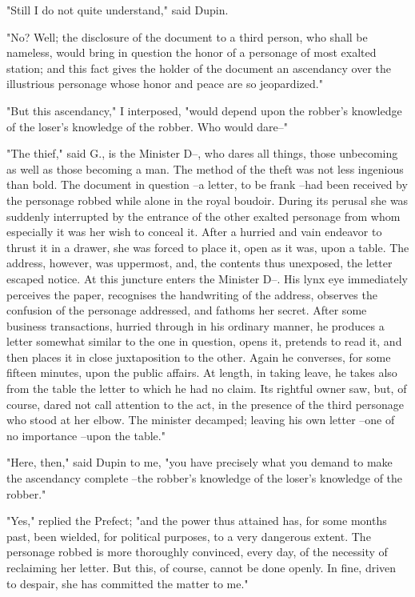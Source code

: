 \documentclass{article}
\begin{document}
"Still I do not quite understand," said Dupin.

"No? Well; the disclosure of the document to a third person, who shall be nameless, would bring in question the honor of a personage of most exalted station; and this fact gives the holder of the document an ascendancy over the illustrious personage whose honor and peace are so jeopardized."

"But this ascendancy," I interposed, "would depend upon the robber's knowledge of the loser's knowledge of the robber. Who would dare--"

"The thief," said G., is the Minister D--, who dares all things, those unbecoming as well as those becoming a man. The method of the theft was not less ingenious than bold. The document in question --a letter, to be frank --had been received by the personage robbed while alone in the royal boudoir. During its perusal she was suddenly interrupted by the entrance of the other exalted personage from whom especially it was her wish to conceal it. After a hurried and vain endeavor to thrust it in a drawer, she was forced to place it, open as it was, upon a table. The address, however, was uppermost, and, the contents thus unexposed, the letter escaped notice. At this juncture enters the Minister D--. His lynx eye immediately perceives the paper, recognises the handwriting of the address, observes the confusion of the personage addressed, and fathoms her secret. After some business transactions, hurried through in his ordinary manner, he produces a letter somewhat similar to the one in question, opens it, pretends to read it, and then places it in close juxtaposition to the other. Again he converses, for some fifteen minutes, upon the public affairs. At length, in taking leave, he takes also from the table the letter to which he had no claim. Its rightful owner saw, but, of course, dared not call attention to the act, in the presence of the third personage who stood at her elbow. The minister decamped; leaving his own letter --one of no importance --upon the table."

"Here, then," said Dupin to me, "you have precisely what you demand to make the ascendancy complete --the robber's knowledge of the loser's knowledge of the robber."

"Yes," replied the Prefect; "and the power thus attained has, for some months past, been wielded, for political purposes, to a very dangerous extent. The personage robbed is more thoroughly convinced, every day, of the necessity of reclaiming her letter. But this, of course, cannot be done openly. In fine, driven to despair, she has committed the matter to me."
\end{document}
